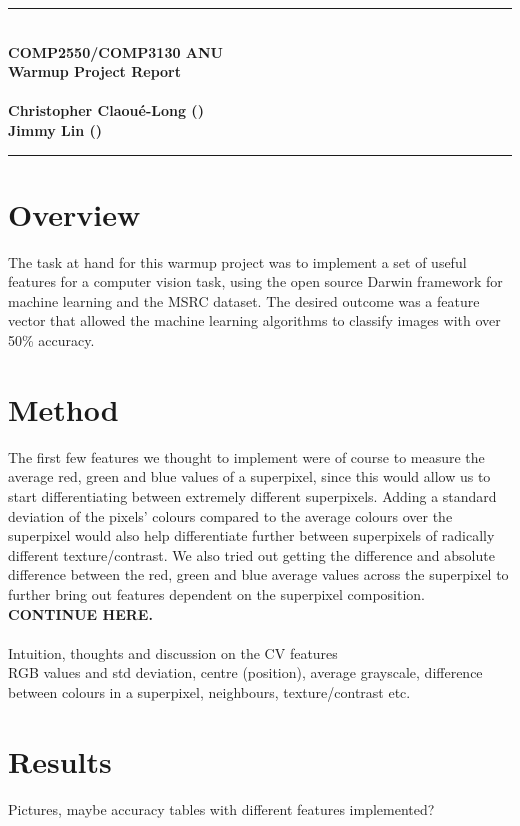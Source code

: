 \documentclass[11pt,a4paper]{article}
\newcommand{\Hrule}{\textcolor{blue}{\rule{\linewidth}{0.5mm}}}
\newcommand{\HUGEBOLD}[1]{\textbf{\Huge{#1}}}
\begin{document}
\begin{center}
\Hrule\\
\textbf{\Huge COMP2550/COMP3130 ANU\\Warmup Project Report}\\
\textbf{\\\large Christopher Claou\'e-Long 
(\href{mailto:u5183532@anu.edu.au}{\textit{\underline{}}})\\
Jimmy Lin 
(\href{mailto:yourUIDhere@anu.edu.au}{\textit{\underline{}}})\\}
\Hrule
\end{center}
\begin{multicols}{2}
\section{Overview}
The task at hand for this warmup project was to implement a set of useful features for a computer vision task, using the open source Darwin framework for machine learning and the MSRC dataset.  The desired outcome was a feature vector that allowed the machine learning algorithms to classify images with over 50\% accuracy.

\section{Method}
The first few features we thought to implement were of course to measure the average red, green and blue values of a superpixel, since this would allow us to start differentiating between extremely different superpixels.  Adding a standard deviation of the pixels' colours compared to the average colours over the superpixel would also help differentiate further between superpixels of radically different texture/contrast.  We also tried out getting the difference and absolute difference between the red, green and blue average values across the superpixel to further bring out features dependent on the superpixel composition. \HUGEBOLD{CONTINUE HERE.}\\\\
Intuition, thoughts and discussion on the CV features\\
RGB values and std deviation, centre (position), average grayscale, difference between colours in a superpixel, neighbours, texture/contrast etc.

\section{Results}
Pictures, maybe accuracy tables with different features implemented?


\end{multicols}
\end{document}
